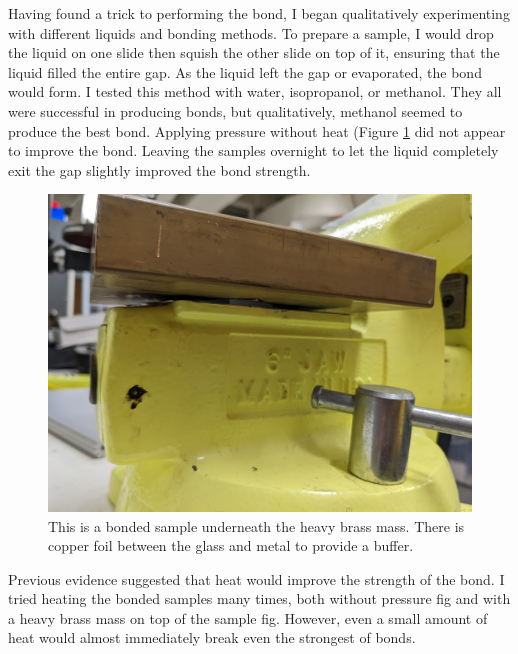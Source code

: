 \documentclass[colorlinks=true,pdfstartview=FitV,linkcolor=blue,
            citecolor=red,urlcolor=magenta]{ligodoc}
\begin{document}
Having found a trick to performing the bond, I began qualitatively experimenting with different liquids and bonding methods. To prepare a sample, I would drop the liquid on one slide then squish the other slide on top of it, ensuring that the liquid filled the entire gap. As the liquid left the gap or evaporated, the bond would form. I tested this method with water, isopropanol, or methanol. They all were successful in producing bonds, but qualitatively, methanol seemed to produce the best bond. Applying pressure  without heat (Figure \ref{fig:squished_sample} did not appear to improve the bond. Leaving the samples overnight to let the liquid completely exit the gap slightly improved the bond strength.

\begin{figure}[htbp]
\begin{center}
\includegraphics[width=6in]{graphics/squished_sample_PXL_20220712_025117243.jpg}
\caption{This is a bonded sample underneath the heavy brass mass. There is copper foil between the glass and metal to provide a buffer.}
\label{fig:squished_sample}
\end{center}
\end{figure}

Previous evidence suggested that heat would improve the strength of the bond. I tried heating the bonded samples many times, both without pressure {{{{fig}}}} and with a heavy brass mass on top of the sample {{{fig}}}. However, even a small amount of heat would almost immediately break even the strongest of bonds.
\end{document}
